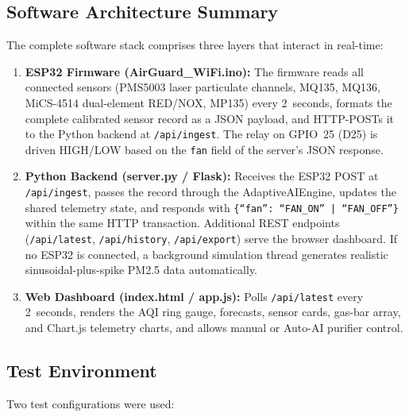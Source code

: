 \FloatBarrier

\subsection{Software Architecture Summary}
\label{sec:exp-software-summary}

The complete software stack comprises three layers that interact in real-time:

\begin{enumerate}
    \item \textbf{ESP32 Firmware (AirGuard\_WiFi.ino):} The firmware reads all connected sensors (PMS5003 laser particulate channels, MQ135, MQ136, MiCS-4514 dual-element RED/NOX, MP135) every 2~seconds, formats the complete calibrated sensor record as a JSON payload, and HTTP-POSTs it to the Python backend at \texttt{/api/ingest}. The relay on GPIO~25 (D25) is driven HIGH/LOW based on the \texttt{fan} field of the server's JSON response.
    \item \textbf{Python Backend (server.py / Flask):} Receives the ESP32 POST at \texttt{/api/ingest}, passes the record through the AdaptiveAIEngine, updates the shared telemetry state, and responds with \texttt{\{``fan'': ``FAN\_ON'' | ``FAN\_OFF''\}} within the same HTTP transaction. Additional REST endpoints (\texttt{/api/latest}, \texttt{/api/history}, \texttt{/api/export}) serve the browser dashboard. If no ESP32 is connected, a background simulation thread generates realistic sinusoidal-plus-spike PM2.5 data automatically.
    \item \textbf{Web Dashboard (index.html / app.js):} Polls \texttt{/api/latest} every 2~seconds, renders the AQI ring gauge, forecasts, sensor cards, gas-bar array, and Chart.js telemetry charts, and allows manual or Auto-AI purifier control.
\end{enumerate}

\subsection{Test Environment}
\label{sec:exp-environment}

Two test configurations were used:

